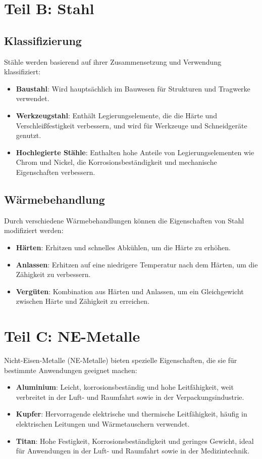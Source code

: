 \documentclass[a4paper,12pt]{article}
\begin{document}
\newpage

\section{Teil B: Stahl}

\subsection{Klassifizierung}

Stähle werden basierend auf ihrer Zusammensetzung und Verwendung klassifiziert:
\begin{itemize}
    \item \textbf{Baustahl}: Wird hauptsächlich im Bauwesen für Strukturen und Tragwerke verwendet.
    \item \textbf{Werkzeugstahl}: Enthält Legierungselemente, die die Härte und Verschleißfestigkeit verbessern, und wird für Werkzeuge und Schneidgeräte genutzt.
    \item \textbf{Hochlegierte Stähle}: Enthalten hohe Anteile von Legierungselementen wie Chrom und Nickel, die Korrosionsbeständigkeit und mechanische Eigenschaften verbessern.
\end{itemize}

\subsection{Wärmebehandlung}

Durch verschiedene Wärmebehandlungen können die Eigenschaften von Stahl modifiziert werden:
\begin{itemize}
    \item \textbf{Härten}: Erhitzen und schnelles Abkühlen, um die Härte zu erhöhen.
    \item \textbf{Anlassen}: Erhitzen auf eine niedrigere Temperatur nach dem Härten, um die Zähigkeit zu verbessern.
    \item \textbf{Vergüten}: Kombination aus Härten und Anlassen, um ein Gleichgewicht zwischen Härte und Zähigkeit zu erreichen.
\end{itemize}

\newpage

\section{Teil C: NE-Metalle}

Nicht-Eisen-Metalle (NE-Metalle) bieten spezielle Eigenschaften, die sie für bestimmte Anwendungen geeignet machen:
\begin{itemize}
    \item \textbf{Aluminium}: Leicht, korrosionsbeständig und hohe Leitfähigkeit, weit verbreitet in der Luft- und Raumfahrt sowie in der Verpackungsindustrie.
    \item \textbf{Kupfer}: Hervorragende elektrische und thermische Leitfähigkeit, häufig in elektrischen Leitungen und Wärmetauschern verwendet.
    \item \textbf{Titan}: Hohe Festigkeit, Korrosionsbeständigkeit und geringes Gewicht, ideal für Anwendungen in der Luft- und Raumfahrt sowie in der Medizintechnik.
\end{itemize}
\end{document}
